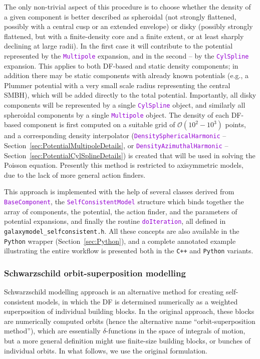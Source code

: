 \documentclass[12pt]{article}
\newcommand{\Cpp}  {\texttt{C++}\xspace}
\newcommand{\Python}{\texttt{Python}\xspace}
\newcommand{\ttt}[1]{\textcolor{darkviolet}{\texttt{#1}}}
\begin{document}
The only non-trivial aspect of this procedure is to choose whether the density of a given component is better described as spheroidal (not strongly flattened, possibly with a central cusp or an extended envelope) or disky (possibly strongly flattened, but with a finite-density core and a finite extent, or at least sharply declining at large radii). In the first case it will contribute to the potential represented by the \ttt{Multipole} expansion, and in the second -- by the \ttt{CylSpline} expansion. This applies to both DF-based and static density components; in addition there may be static components with already known potentials (e.g., a Plummer potential with a very small scale radius representing the central SMBH), which will be added directly to the total potential. Importantly, all disky components will be represented by a single \ttt{CylSpline} object, and similarly all spheroidal components by a single \ttt{Multipole} object.
The density of each DF-based component is first computed on a suitable grid of $\mathcal{O}(10^2-10^3)$ points, and a corresponding density interpolator (\ttt{DensitySphericalHarmonic} -- Section~\ref{sec:PotentialMultipoleDetails}, or \ttt{DensityAzimuthalHarmonic} -- Section~\ref{sec:PotentialCylSplineDetails}) is created that will be used in solving the Poisson equation. 
Presently this method is restricted to axisymmetric models, due to the lack of more general action finders.

This approach is implemented with the help of several classes derived from \ttt{BaseComponent}, the \ttt{SelfConsistentModel} structure which binds together the array of components, the potential, the action finder, and the parameters of potential expansions, and finally the routine \ttt{doIteration}, all defined in \texttt{galaxymodel_selfconsistent.h}. All these concepts are also available in the \Python wrapper (Section~\ref{sec:Python}), and a complete annotated example illustrating the entire workflow is presented both in the \Cpp and \Python variants.


\subsubsection{Schwarzschild orbit-superposition modelling}  \label{sec:Schwarzschild}

Schwarzschild modelling approach \cite{Schwarzschild1979} is an alternative method for creating self-consistent models, in which the DF is determined numerically as a weighted superposition of individual building blocks. In the original approach, these blocks are numerically computed orbits (hence the alternative name ``orbit-superposition method''), which are essentially $\delta$-functions in the space of integrals of motion, but a more general definition might use finite-size building blocks, or bunches of individual orbits. In what follows, we use the original formulation.
\end{document}
